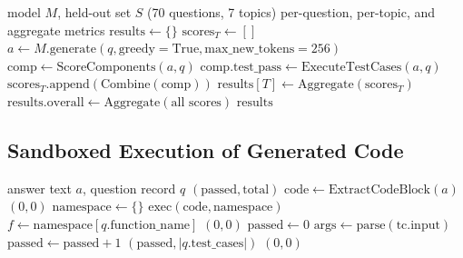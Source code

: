 \documentclass[12pt,a4paper]{report}
\begin{document}
\begin{algorithm}[htbp]
\caption{Evaluation Protocol}
\begin{algorithmic}[1]
\Require model $M$, held-out set $S$ (70 questions, 7 topics)
\Ensure per-question, per-topic, and aggregate metrics
\State $\text{results} \gets \{\}$
    \State $\text{scores}_T \gets []$
        \State $a \gets M.\text{generate}(q, \text{greedy}=\text{True}, \text{max\_new\_tokens}=256)$
        \State $\text{comp} \gets \text{ScoreComponents}(a, q)$
            \State $\text{comp}.\text{test\_pass} \gets \text{ExecuteTestCases}(a, q)$
        \EndIf
        \State $\text{scores}_T.\text{append}(\text{Combine}(\text{comp}))$
    \EndFor
    \State $\text{results}[T] \gets \text{Aggregate}(\text{scores}_T)$
\EndFor
\State $\text{results}.\text{overall} \gets \text{Aggregate}(\text{all scores})$
\State \Return $\text{results}$
\end{algorithmic}
\end{algorithm}

\subsection{Sandboxed Execution of Generated Code}

\begin{algorithm}[htbp]
\caption{Test Case Execution}
\begin{algorithmic}[1]
\Require answer text $a$, question record $q$
\Ensure $(\text{passed}, \text{total})$
\State $\text{code} \gets \text{ExtractCodeBlock}(a)$
    \State \Return $(0, 0)$
\EndIf
\State $\text{namespace} \gets \{\}$
\Try
    \State $\text{exec}(\text{code}, \text{namespace})$
    \State $f \gets \text{namespace}[q.\text{function\_name}]$
        \State \Return $(0, 0)$
    \EndIf
    \State $\text{passed} \gets 0$
        \Try
            \State $\text{args} \gets \text{parse}(\text{tc}.\text{input})$
                \State $\text{passed} \gets \text{passed} + 1$
            \EndIf
        \EndTry
    \EndFor
    \State \Return $(\text{passed}, |q.\text{test\_cases}|)$
\EndTry
\State \Return $(0, 0)$
\end{algorithmic}
\end{algorithm}
\end{document}
